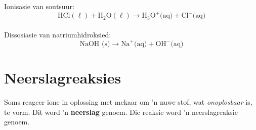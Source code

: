 Ionisasie van soutsuur:\\
        \label{m38720*id339770}\nopagebreak\noindent          
    \begin{equation*}
    \text{HCl} (\ell)  +{\text{H}}_{2}\text{O} (\ell) \to {\text{H}}_{3}{\text{O}}^{+} \text{(aq)} +{\text{Cl}}^{-} \text{(aq)}
      \end{equation*}\\
        \label{m38720*id339831}\nopagebreak\noindent
Dissosiasie van natriumhidroksied:\\          
    \begin{equation*}
    \text{NaOH (s)} \to {\text{Na}}^{+} \text{(aq)} + {\text{OH}}^{-} \text{(aq)}
      \end{equation*}
 \par 
\label{m38720**end}
            \section{Neerslagreaksies}
            \nopagebreak
Soms reageer ione in oplossing met mekaar om 'n nuwe stof, wat \textsl{onoplosbaar} is, te vorm. Dit word 'n \textbf{neerslag} genoem. Die reaksie word 'n neerslagreaksie genoem.\par 


